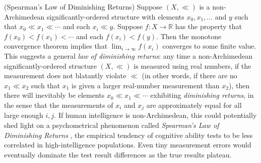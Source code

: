 \documentclass[twoside,11pt]{article}
\begin{document}
\begin{remark}
(Spearman's Law of Diminishing Returns)
Suppose $(X,\ll)$ is a non-Archimedean significantly-ordered structure
with elements $x_0,x_1,\ldots$ and $y$ such that
$x_0\ll x_1\ll\cdots$ and each $x_i\ll y$.
Suppose $f:X\to\mathbb R$ has the property that $f(x_0)<f(x_1)<\cdots$
and each $f(x_i)<f(y)$. Then the monotone convergence theorem implies
that $\lim_{i\to\infty}f(x_i)$ converges to some finite value.
This suggests a general \emph{law
of diminishing returns}: any time a non-Archimedean significantly-ordered
structure $(X,\ll)$ is measured using
real numbers, if the measurement does not blatantly violate $\ll$ (in other
words, if there are no $x_1\ll x_2$ such that $x_1$ is given a larger real-number
measurement than $x_2$), then there will inevitably be elements $x_0\ll x_1\ll \cdots$
exhibiting \emph{diminishing returns}, in the sense that the measurements of
$x_i$ and $x_j$ are approximately equal for all large enough $i,j$.
If human intelligence is non-Archimedean, this could potentially shed light on
a psychometrical phenomenon called \emph{Spearman's Law of Diminishing Returns}
\citep{spearman1927abilities, blum2017spearman, hernandez2019ai}, the empirical
tendency of cognitive ability tests to be less correlated in
high-intelligence populations. Even tiny measurement errors would eventually
dominate the test result differences as the true results plateau.
\end{remark}
\end{document}

